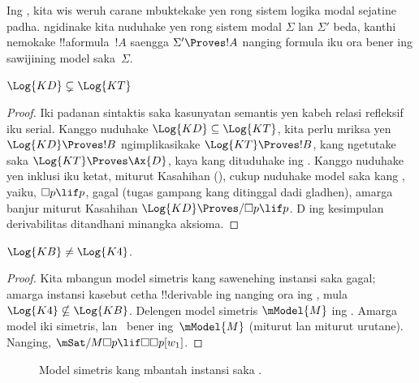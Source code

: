\documentclass[../../../include/open-logic-section]{subfiles}
\begin{document}


Ing , kita wis weruh carane mbuktekake yen rong
sistem logika modal sejatine padha. 
ngidinake kita nuduhake yen rong sistem modal $\Sigma$ lan $\Sigma'$
beda, kanthi nemokake !!a{formula}~$!A$ saengga $\Sigma' \Proves !A$
nanging formula iku ora bener ing sawijining model saka~$\Sigma$.

\begin{prop}
  $\Log{KD} \subsetneq \Log{KT}$
\end{prop}

\begin{proof} Iki padanan sintaktis saka kasunyatan semantis
  yen kabeh relasi refleksif iku serial. Kanggo nuduhake $\Log{KD} \subseteq
  \Log{KT}$, kita perlu mriksa yen $\Log{KD} \Proves !B$ ngimplikasikake
  $\Log{KT} \Proves !B$, kang ngetutake saka $\Log{KT} \Proves
  \Ax{D}$, kaya kang dituduhake ing
  . Kanggo nuduhake
  yen inklusi iku ketat, miturut Kasahihan
  (), cukup nuduhake model saka
   kang , yaiku, $\Box p \lif p$, gagal (tugas
  gampang kang ditinggal dadi gladhen), amarga banjur miturut Kasahihan
  $\Log{KD} \Proves/ \Box p \lif p$.
D ing kesimpulan derivabilitas ditandhani minangka aksioma.
\end{proof}

\begin{prop}
  $\Log{KB} \neq \Log{K4}$. 
\end{prop}

\begin{proof}
  Kita mbangun model simetris kang sawenehing instansi saka  gagal;
  amarga instansi kasebut cetha !!{derivable} ing  nanging ora
  ing , mula $\Log{K4} \nsubseteq \Log{KB}$.
  Delengen model simetris $\mModel{M}$ ing . Amarga
  model iki simetris,  lan~ bener ing~$\mModel{M}$
  (miturut  lan
   miturut urutane). Nanging,
  $\mSat/{M}{\Box p \lif \Box\Box p}[w_1]$.
\end{proof}

\begin{figure}[htpb]
  \centering
  \caption{Model simetris kang mbantah instansi saka .}
\end{figure}
\end{document}
